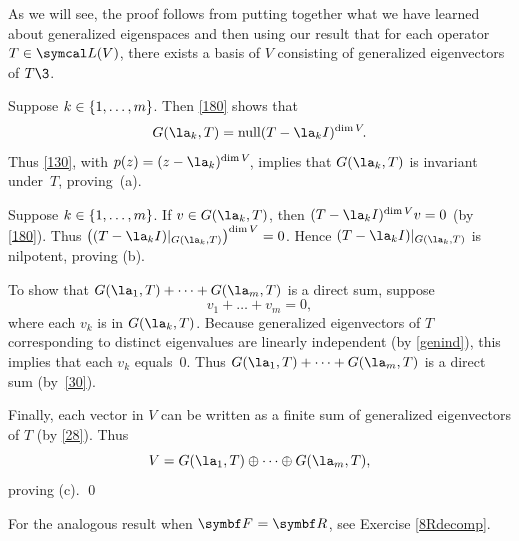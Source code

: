 As we will see, the proof follows from putting together what we have learned about generalized eigenspaces and then using our result that for each operator $T \in \L(V)$, there exists a basis of $V$ consisting of generalized eigenvectors of $T\3$.


\proof
\begin{subtheorem}
\item
Suppose $k \in \{1, \ldots, m\}$. Then \ref{180} shows that
\[
G(\la_k, T) = \ker (T - \la_k I)^{\dim V}\!.
\]
Thus \ref{130}, with $p(z) = (z - \la_k)^{\dim V}\!$, implies that $G(\la_k, T)$ is invariant under~$T$, proving~(a).

\item
Suppose $k \in \{1, \ldots, m\}$. If $v \in G(\la_k, T)$, then $(T - \la_k I)^{\dim V} v = 0$ (by \ref{180}). Thus
$\paren[\big]{(T - \la_k I)|_{G(\la_k,T)}}^{\dim V} = 0$.
Hence $(T - \la_k I)|_{G(\la_k, T)}$ is nilpotent, proving (b).

\item
To show that $G(\la_1, T) + \dots + G(\la_m, T)$ is a direct sum, suppose
\[
v_1 + \dots + v_m = 0,
\]
where each $v_k$ is in $G(\la_k, T)$.  Because generalized eigenvectors of $T$ corresponding to distinct eigenvalues are linearly
independent (by \ref{genind}), this implies that each $v_k$
equals~$0$. Thus $G(\la_1, T) + \dots + G(\la_m, T)$ is a direct sum (by~\ref{30}).

Finally, each vector in $V$ can be written as a finite sum of generalized eigenvectors of $T$ (by \ref{28}). Thus
\[
V = G(\la_1, T) \oplus \dots \oplus G(\la_m, T),
\]
proving (c).
\qed
\end{subtheorem}

For the analogous result when $\F{}=\R{}$, see Exercise \ref{8Rdecomp}.

\pagebreak[3]

